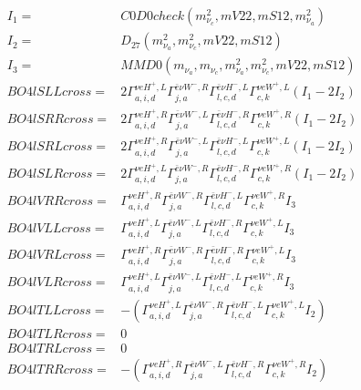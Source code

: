 \documentclass[A4,landscape]{article}
\begin{document}
\begin{align} 
I_1 = & C0D0check(m^2_{\nu_{{c}}}, mV22, mS12, m^2_{\nu_{{a}}}) \\ 
I_2 = & D_{27}(m^2_{\nu_{{a}}}, m^2_{\nu_{{c}}}, mV22, mS12) \\ 
I_3 = & MMD0(m_{\nu_{{a}}}, m_{\nu_{{c}}}, m^2_{\nu_{{a}}}, m^2_{\nu_{{c}}}, mV22, mS12) \\ 
  BO4lSLLcross= & 2  \Gamma^{\nu e H^+,L}_{a, i, d} \Gamma^{\bar{e}\nu W^- ,R}_{j, a} \Gamma^{\bar{e}\nu H^- ,L}_{l, c, d} \Gamma^{\nu e W^+,L}_{c, k} (I_1 - 2 I_2) \\ 
  BO4lSRRcross= & 2  \Gamma^{\nu e H^+,R}_{a, i, d} \Gamma^{\bar{e}\nu W^- ,L}_{j, a} \Gamma^{\bar{e}\nu H^- ,R}_{l, c, d} \Gamma^{\nu e W^+,R}_{c, k} (I_1 - 2 I_2) \\ 
  BO4lSRLcross= & 2  \Gamma^{\nu e H^+,R}_{a, i, d} \Gamma^{\bar{e}\nu W^- ,L}_{j, a} \Gamma^{\bar{e}\nu H^- ,L}_{l, c, d} \Gamma^{\nu e W^+,L}_{c, k} (I_1 - 2 I_2) \\ 
  BO4lSLRcross= & 2  \Gamma^{\nu e H^+,L}_{a, i, d} \Gamma^{\bar{e}\nu W^- ,R}_{j, a} \Gamma^{\bar{e}\nu H^- ,R}_{l, c, d} \Gamma^{\nu e W^+,R}_{c, k} (I_1 - 2 I_2) \\ 
  BO4lVRRcross= &  \Gamma^{\nu e H^+,R}_{a, i, d} \Gamma^{\bar{e}\nu W^- ,R}_{j, a} \Gamma^{\bar{e}\nu H^- ,L}_{l, c, d} \Gamma^{\nu e W^+,R}_{c, k} I_3 \\ 
  BO4lVLLcross= &  \Gamma^{\nu e H^+,L}_{a, i, d} \Gamma^{\bar{e}\nu W^- ,L}_{j, a} \Gamma^{\bar{e}\nu H^- ,R}_{l, c, d} \Gamma^{\nu e W^+,L}_{c, k} I_3 \\ 
  BO4lVRLcross= &  \Gamma^{\nu e H^+,R}_{a, i, d} \Gamma^{\bar{e}\nu W^- ,R}_{j, a} \Gamma^{\bar{e}\nu H^- ,R}_{l, c, d} \Gamma^{\nu e W^+,L}_{c, k} I_3 \\ 
  BO4lVLRcross= &  \Gamma^{\nu e H^+,L}_{a, i, d} \Gamma^{\bar{e}\nu W^- ,L}_{j, a} \Gamma^{\bar{e}\nu H^- ,L}_{l, c, d} \Gamma^{\nu e W^+,R}_{c, k} I_3 \\ 
  BO4lTLLcross= & -( \Gamma^{\nu e H^+,L}_{a, i, d} \Gamma^{\bar{e}\nu W^- ,R}_{j, a} \Gamma^{\bar{e}\nu H^- ,L}_{l, c, d} \Gamma^{\nu e W^+,L}_{c, k} I_2) \\ 
  BO4lTLRcross= & 0 \\ 
  BO4lTRLcross= & 0 \\ 
  BO4lTRRcross= & -( \Gamma^{\nu e H^+,R}_{a, i, d} \Gamma^{\bar{e}\nu W^- ,L}_{j, a} \Gamma^{\bar{e}\nu H^- ,R}_{l, c, d} \Gamma^{\nu e W^+,R}_{c, k} I_2) \\ 
\end{align} 
\end{document}
